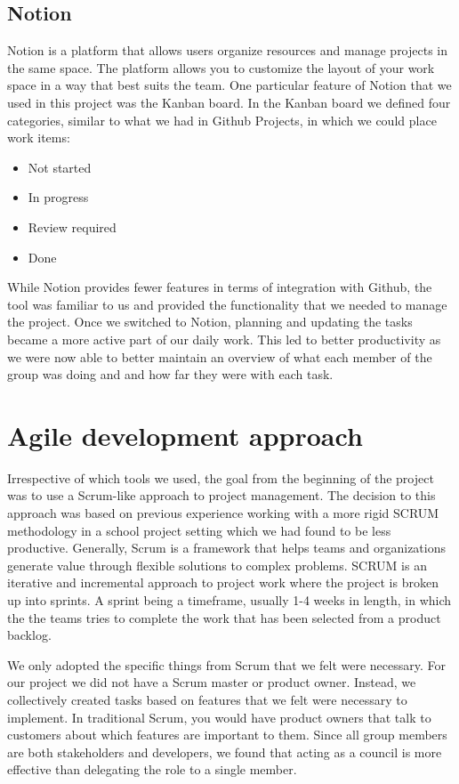 \subsection{Notion}
Notion is a platform that allows users organize resources and manage projects in the same space. The platform allows you to customize the layout of your work space in a way that best suits the team. One particular feature of Notion that we used in this project was the Kanban board. In the Kanban board we defined four categories, similar to what we had in Github Projects, in which we could place work items:

\begin{itemize}
    \item Not started
    \item In progress
    \item Review required
    \item Done
\end{itemize}

While Notion provides fewer features in terms of integration with Github, the tool was familiar to us and provided the functionality that we needed to manage the project.
Once we switched to Notion, planning and updating the tasks became a more active part of our daily work. This led to better productivity as we were now able to better maintain an overview of what each member of the group was doing and and how far they were with each task.

\section{Agile development approach} \label{sec:agile-dev}
Irrespective of which tools we used, the goal from the beginning of the project was to use a Scrum-like approach to project management.
The decision to this approach was based on previous experience working with a more rigid SCRUM methodology in a school project setting which we had found to be less productive.
Generally, Scrum is a framework that helps teams and organizations generate value through flexible solutions to complex problems. SCRUM is an iterative and incremental approach to project work where the project is broken up into sprints. A sprint being a timeframe, usually 1-4 weeks in length, in which the the teams tries to complete the work that has been selected from a product backlog.

We only adopted the specific things from Scrum that we felt were necessary. For our project we did not have a Scrum master or product owner. Instead, we collectively created tasks based on features that we felt were necessary to implement.
In traditional Scrum, you would have product owners that talk to customers about which features are important to them. Since all group members are both stakeholders and developers, we found that acting as a council is more effective than delegating the role to a single member.

